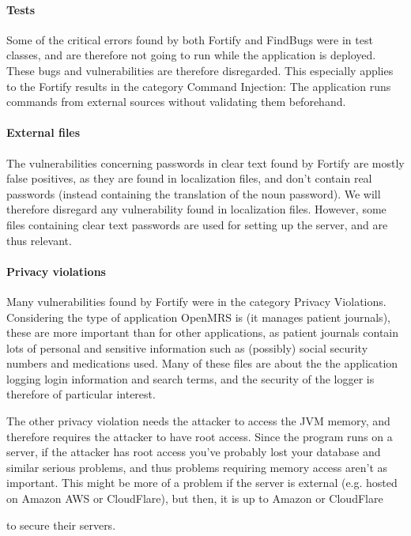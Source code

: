 \documentclass{article}
\begin{document}
\paragraph{Tests}
Some of the critical errors found by both Fortify and FindBugs were in test
classes, and are therefore not going to run while the application is deployed.
These bugs and vulnerabilities are therefore disregarded. This especially
applies to the Fortify results in the category Command Injection: The
application runs commands from external sources without validating them
beforehand.

\paragraph{External files}
The vulnerabilities concerning passwords in clear text found by Fortify are
mostly false positives, as they are found in localization files, and don't
contain real passwords (instead containing the translation of the noun
password). We will therefore disregard any vulnerability found in localization
files. However, some files containing clear text passwords are used for setting
up the server, and are thus relevant.

\paragraph{Privacy violations}
Many vulnerabilities found by Fortify were in the category Privacy Violations.
Considering the type of application OpenMRS is (it manages patient journals),
these are more important than for other applications, as patient journals
contain lots of personal and sensitive information such as (possibly) social security
numbers and medications used. Many of these files are about the the application
logging login information and search terms, and the security of the logger is therefore of
particular interest.

The other privacy violation needs the attacker to access the JVM memory, and
therefore requires the attacker to have root access. Since the program runs on a
server, if the attacker has root access you've probably lost your database and
similar serious problems, and thus problems requiring memory access aren't as
important. This might be more of a problem if the server is external (e.g.
hosted on Amazon AWS or CloudFlare), but then, it is up to Amazon or CloudFlare

to secure their servers.
\end{document}
